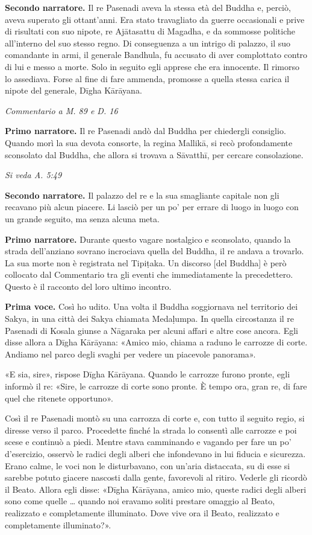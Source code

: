 \textbf{Secondo narratore.} Il re Pasenadi aveva la stessa età del Buddha e,
perciò, aveva superato gli ottant’anni. Era stato travagliato da guerre
occasionali e prive di risultati con suo nipote, re Ajātasattu di
Magadha, e da sommosse politiche all’interno del suo stesso regno. Di
conseguenza a un intrigo di palazzo, il suo comandante in armi, il
generale Bandhula, fu accusato di aver complottato contro di lui e messo
a morte. Solo in seguito egli apprese che era innocente. Il rimorso lo
assediava. Forse al fine di fare ammenda, promosse a quella stessa
carica il nipote del generale, Dīgha Kārāyana.


\emph{Commentario a M. 89 e D. 16}


\textbf{Primo narratore.} Il re Pasenadi andò dal Buddha per chiedergli
consiglio. Quando morì la sua devota consorte, la regina Mallikā, si
recò profondamente sconsolato dal Buddha, che allora si trovava a
Sāvatthī, per cercare consolazione.


\emph{Si veda A. 5:49}


\textbf{Secondo narratore.} Il palazzo del re e la sua smagliante capitale non
gli recavano più alcun piacere. Li lasciò per un po’ per errare di luogo
in luogo con un grande seguito, ma senza alcuna meta.


\textbf{Primo narratore.} Durante questo vagare nostalgico e sconsolato, quando
la strada dell’anziano sovrano incrociava quella del Buddha, il re
andava a trovarlo. La sua morte non è registrata nel Tipiṭaka. Un
discorso [del Buddha] è però collocato dal Commentario tra gli eventi
che immediatamente la precedettero. Questo è il racconto del loro ultimo
incontro.


\textbf{Prima voce.} Così ho udito. Una volta il Buddha soggiornava nel
territorio dei Sakya, in una città dei Sakya chiamata Medaḷumpa. In
quella circostanza il re Pasenadi di Kosala giunse a Nāgaraka per alcuni
affari e altre cose ancora. Egli disse allora a Dīgha Kārāyana: «Amico
mio, chiama a raduno le carrozze di corte. Andiamo nel parco degli
svaghi per vedere un piacevole panorama».


«E sia, sire», rispose Dīgha Kārāyana. Quando le carrozze furono pronte,
egli informò il re: «Sire, le carrozze di corte sono pronte. È tempo
ora, gran re, di fare quel che ritenete opportuno».


Così il re Pasenadi montò su una carrozza di corte e, con tutto il
seguito regio, si diresse verso il parco. Procedette finché la strada lo
consentì alle carrozze e poi scese e continuò a piedi. Mentre stava
camminando e vagando per fare un po’ d’esercizio, osservò le radici
degli alberi che infondevano in lui fiducia e sicurezza. Erano calme, le
voci non le disturbavano, con un’aria distaccata, su di esse si sarebbe
potuto giacere nascosti dalla gente, favorevoli al ritiro. Vederle gli
ricordò il Beato. Allora egli disse: «Dīgha Kārāyana, amico mio, queste
radici degli alberi sono come quelle … quando noi eravamo soliti
prestare omaggio al Beato, realizzato e completamente illuminato. Dove
vive ora il Beato, realizzato e completamente illuminato?».


